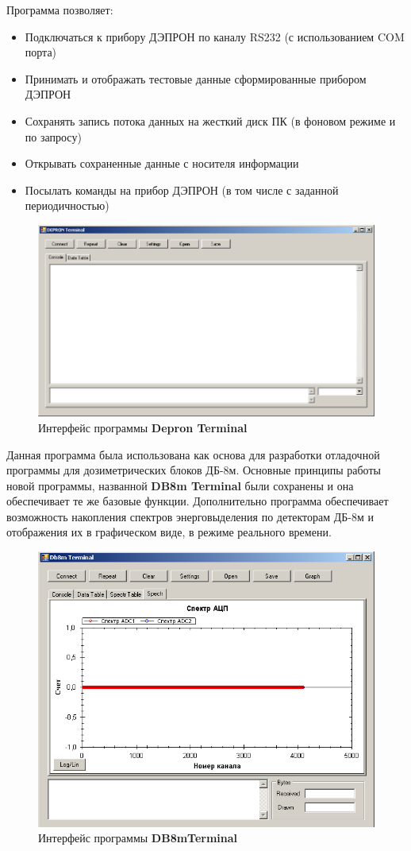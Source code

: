Программа позволяет:


\begin{itemize}
	\item 	Подключаться к прибору ДЭПРОН по каналу RS232 (с использованием COM порта)
	
	
	\item 	Принимать и отображать тестовые данные сформированные прибором ДЭПРОН
	
	
	\item 	Сохранять запись потока данных на жесткий диск ПК (в фоновом режиме и по запросу)
	
	
	\item 	Открывать сохраненные данные с носителя информации
	
	
	\item 	Посылать команды на прибор ДЭПРОН (в том числе с заданной периодичностью)
	
	
\end{itemize}
\begin{figure}
\centering
\includegraphics[width=0.7\linewidth]{images/depron_terminal}
\caption{Интерфейс программы \textbf{Depron Terminal}}
\label{fig:depron_terminal}
\end{figure}

Данная программа была использована как основа для разработки отладочной программы для дозиметрических блоков ДБ-8м. Основные принципы работы новой программы, названной \textbf{DB8m Terminal} были сохранены и она обеспечивает те же базовые функции. Дополнительно программа обеспечивает возможность накопления спектров энерговыделения по детекторам ДБ-8м и отображения их в графическом виде, в режиме реального времени. 
\begin{figure}
\centering
\includegraphics[width=0.7\linewidth]{images/db8m_terminal}
\caption{Интерфейс программы \textbf{DB8mTerminal}}
\label{fig:db8m_terminal}
\end{figure}

